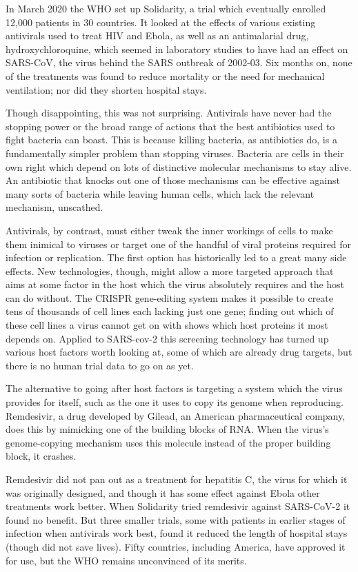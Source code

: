 \documentclass{article}
\begin{document}
In March 2020 the WHO set up Solidarity, a trial which eventually enrolled 12,000 patients in 30 countries. It looked at the effects of various existing antivirals used to treat HIV and Ebola, as well as an antimalarial drug, hydroxychloroquine, which seemed in laboratory studies to have had an effect on SARS-CoV, the virus behind the SARS outbreak of 2002-03. Six months on, none of the treatments was found to reduce mortality or the need for mechanical ventilation; nor did they shorten hospital stays. 

Though disappointing, this was not surprising. Antivirals have never had the stopping power or the broad range of actions that the best antibiotics used to fight bacteria can boast. This is because killing bacteria, as antibiotics do, is a fundamentally simpler problem than stopping viruses. Bacteria are cells in their own right which depend on lots of distinctive molecular mechanisms to stay alive. An antibiotic that knocks out one of those mechanisms can be effective against many sorts of bacteria while leaving human cells, which lack the relevant mechanism, unscathed. 

Antivirals, by contrast, must either tweak the inner workings of cells to make them inimical to viruses or target one of the handful of viral proteins required for infection or replication. The first option has historically led to a great many side effects. New technologies, though, might allow a more targeted approach that aims at some factor in the host which the virus absolutely requires and the host can do without. The CRISPR gene-editing system makes it possible to create tens of thousands of cell lines each lacking just one gene; finding out which of these cell lines a virus cannot get on with shows which host proteins it most depends on. Applied to SARS-cov-2 this screening technology has turned up various host factors worth looking at, some of which are already drug targets, but there is no human trial data to go on as yet. 

The alternative to going after host factors is targeting a system which the virus provides for itself, such as the one it uses to copy its genome when reproducing. Remdesivir, a drug developed by Gilead, an American pharmaceutical company, does this by mimicking one of the building blocks of RNA. When the virus's genome-copying mechanism uses this molecule instead of the proper building block, it crashes. 

Remdesivir did not pan out as a treatment for hepatitis C, the virus for which it was originally designed, and though it has some effect against Ebola other treatments work better. When Solidarity tried remdesivir against SARS-CoV-2 it found no benefit. But three smaller trials, some with patients in earlier stages of infection when antivirals work best, found it reduced the length of hospital stays (though did not save lives). Fifty countries, including America, have approved it for use, but the WHO remains unconvinced of its merits. 
\end{document}
